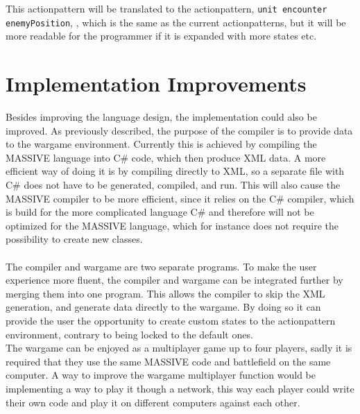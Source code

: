 This actionpattern will be translated to the actionpattern, \texttt{unit encounter enemyPosition}, , which is the same as the current actionpatterns, but it will be more readable for the programmer if it is expanded with more states etc.


\section{Implementation Improvements}
Besides improving the language design, the implementation could also be improved. As previously described, the purpose of the compiler is to provide data to the wargame environment.
Currently this is achieved by compiling the MASSIVE language into C\# code, which then produce XML data. 
A more efficient way of doing it is by compiling directly to XML, so a separate file with C\# does not have to be generated, compiled, and run. 
This will also cause the MASSIVE compiler to be more efficient, since it relies on the C\# compiler, which is build for the more complicated language C\# and therefore will not be optimized for the MASSIVE language, which for instance does not require the possibility to create new classes.\\
 \\
The compiler and wargame are two separate programs. To make the user experience more fluent, the compiler and wargame can be integrated further by merging them into one program.
This allows the compiler to skip the XML generation, and generate data directly to the wargame. By doing so it can provide the user the opportunity to create custom states to the actionpattern environment, contrary to being locked to the default ones.\newline
 \\
The wargame can be enjoyed as a multiplayer game up to four players, sadly it is required that they use the same MASSIVE code and battlefield on the same computer. A way to improve the wargame multiplayer function would be implementing a way to play it though a network, this way each player could write their own code and play it on different computers against each other.

